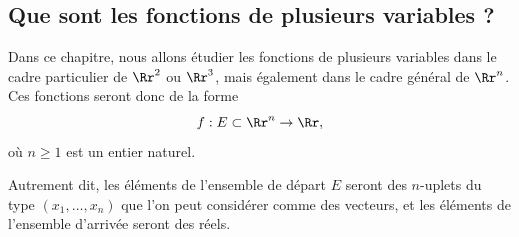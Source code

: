 \documentclass[11pt, class=report,crop=false]{standalone}
\begin{document}
\subsection{Que sont les fonctions de plusieurs variables ?}

Dans ce chapitre, nous allons étudier les fonctions de plusieurs variables dans le cadre particulier de $\Rr^2$ ou $\Rr^3$, mais également dans le cadre général de $\Rr^n$. Ces fonctions seront donc de la forme 
\begin{equation*}
f:E \subset \Rr^n \rightarrow \Rr,
\end{equation*}
où $n\ge 1$ est un entier naturel. 

Autrement dit, les éléments de l'ensemble de départ $E$ seront des $n$-uplets du type $(x_1,\ldots,x_n)$ que l'on peut considérer comme des vecteurs, et les éléments de l'ensemble d'arrivée seront des réels.
\end{document}
